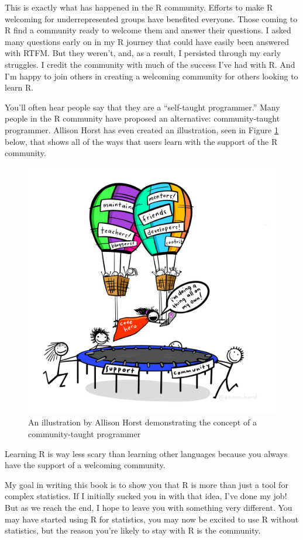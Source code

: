 \documentclass[
]{book}
\begin{document}
This is exactly what has happened in the R community. Efforts to make R welcoming for underrepresented groups have benefited everyone. Those coming to R find a community ready to welcome them and answer their questions. I asked many questions early on in my R journey that could have easily been answered with RTFM. But they weren't, and, as a result, I persisted through my early struggles. I credit the community with much of the success I've had with R. And I'm happy to join others in creating a welcoming community for others looking to learn R.

You'll often hear people say that they are a ``self-taught programmer.'' Many people in the R community have proposed an alternative: community-taught programmer. Allison Horst has even created an illustration, seen in Figure \ref{fig:community-supported-learning} below, that shows all of the ways that users learn with the support of the R community.

\begin{figure}
\includegraphics[width=1\linewidth]{assets/community-supported-learning} \caption{An illustration by Allison Horst demonstrating the concept of a community-taught programmer}\label{fig:community-supported-learning}
\end{figure}

Learning R is way less scary than learning other languages because you always have the support of a welcoming community.

My goal in writing this book is to show you that R is more than just a tool for complex statistics. If I initially sucked you in with that idea, I've done my job! But as we reach the end, I hope to leave you with something very different. You may have started using R for statistics, you may now be excited to use R without statistics, but the reason you're likely to stay with R is the community.
\end{document}
